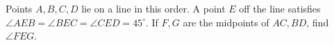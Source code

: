 Points $A,B,C,D$ lie on a line in this order. A point $E$ off the line satisfies $\angle AEB=\angle BEC=\angle CED=45^\circ$. If $F,G$ are the midpoints of $AC,BD$, find $\angle FEG$.
